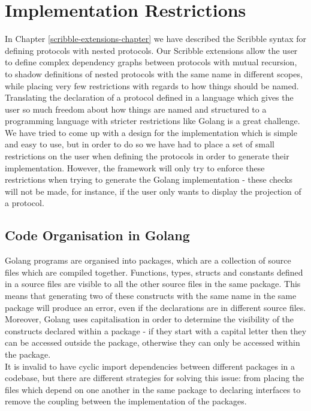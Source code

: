 \documentclass[12pt,twoside]{report}
\begin{document}
\section{Implementation Restrictions}\label{implementation-restrictions}
In Chapter \ref{scribble-extensions-chapter} we have described the Scribble syntax for defining protocols with nested protocols. Our Scribble extensions allow the user to define complex dependency graphs between protocols with mutual recursion, to shadow definitions of nested protocols with the same name in different scopes, while placing very few restrictions with regards to how things should be named.\\

Translating the declaration of a protocol defined in a language which gives the user so much freedom about how things are named and structured to a programming language with stricter restrictions like Golang is a great challenge. We have tried to come up with a design for the implementation which is simple and easy to use, but in order to do so we have had to place a set of small restrictions on the user when defining the protocols in order to generate their implementation. However, the framework will only try to enforce these restrictions when trying to generate the Golang implementation - these checks will not be made, for instance, if the user only wants to display the projection of a protocol.\\

\subsection{Code Organisation in Golang}

Golang programs are organised into packages, which are a collection of source files which are compiled together. Functions, types, structs and constants defined in a source files are visible to all the other source files in the same package\cite{godocs}. This means that generating two of these constructs with the same name in the same package will produce an error, even if the declarations are in different source files. Moreover, Golang uses capitalisation in order to determine the visibility of the constructs declared within a package - if they start with a capital letter then they can be accessed outside the package, otherwise they can only be accessed within the package.\\

It is invalid to have cyclic import dependencies between different packages in a codebase, but there are different strategies for solving this issue: from placing the files which depend on one another in the same package to declaring interfaces to remove the coupling between the implementation of the packages.\\
\end{document}
